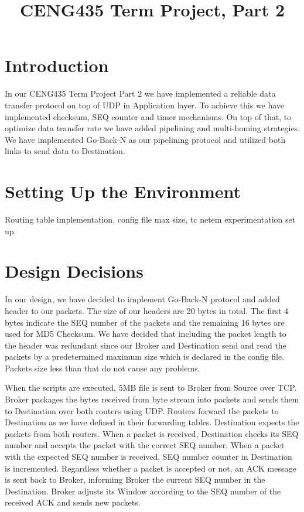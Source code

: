 \documentclass[conference]{IEEEtran}
\begin{document}
\title{CENG435 Term Project, Part 2\\
}

\author{
\IEEEauthorblockA{
}
\and
{}
\IEEEauthorblockA{
}
}

\maketitle

\section{Introduction}

In our CENG435 Term Project Part 2 we have implemented a reliable data transfer protocol on top of UDP in Application layer. To achieve this we have implemented checksum, SEQ counter and timer mechanisms. On top of that, to optimize data transfer rate we have added pipelining and multi-homing strategies. We have implemented Go-Back-N as our pipelining protocol and utilized both links to send data to Destination.

\section{Setting Up the Environment}
 Routing table implementation, config file max size, tc netem experimentation set up.

\section{Design Decisions}

In our design, we have decided to implement Go-Back-N protocol and added header to our packets. The size of our headers are 20 bytes in total. The first 4 bytes indicate the SEQ number of the packets and the remaining 16 bytes are used for MD5 Checksum. We have decided that including the packet length to the header was redundant since our Broker and Destination send and read the packets by a predetermined maximum size which is declared in the config file. Packets size less than that do not cause any problems.

When the scripts are executed, 5MB file is sent to Broker from Source over TCP. Broker packages the bytes received from byte stream into packets and sends them to Destination over both routers using UDP. Routers forward the packets to Destination as we have defined in their forwarding tables. Destination expects the packets from both routers. When a packet is received, Destination checks its SEQ number and accepts the packet with the correct SEQ number. When a packet with the expected SEQ number is received, SEQ number counter in Destination is incremented. Regardless whether a packet is accepted or not, an ACK message is sent back to Broker, informing Broker the current SEQ number in the Destination. Broker adjusts its Window according to the SEQ number of the received ACK and sends new packets.
\end{document}
